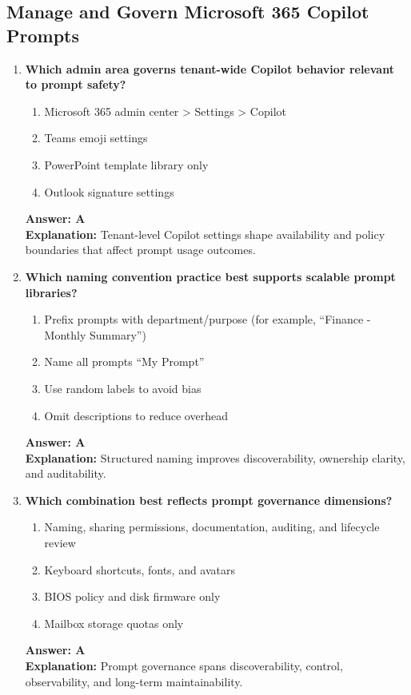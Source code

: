 \documentclass[10pt]{article}
\begin{document}
\subsection{Manage and Govern Microsoft 365 Copilot Prompts}
\begin{enumerate}[leftmargin=*]

\item \textbf{Which admin area governs tenant-wide Copilot behavior relevant to prompt safety?}
\begin{enumerate}[label=\Alph*.]
  \item Microsoft 365 admin center > Settings > Copilot
  \item Teams emoji settings
  \item PowerPoint template library only
  \item Outlook signature settings
\end{enumerate}
\textbf{Answer: A}\\
\textbf{Explanation:} Tenant-level Copilot settings shape availability and policy boundaries that affect prompt usage outcomes.

\item \textbf{Which naming convention practice best supports scalable prompt libraries?}
\begin{enumerate}[label=\Alph*.]
  \item Prefix prompts with department/purpose (for example, ``Finance - Monthly Summary'')
  \item Name all prompts ``My Prompt''
  \item Use random labels to avoid bias
  \item Omit descriptions to reduce overhead
\end{enumerate}
\textbf{Answer: A}\\
\textbf{Explanation:} Structured naming improves discoverability, ownership clarity, and auditability.

\item \textbf{Which combination best reflects prompt governance dimensions?}
\begin{enumerate}[label=\Alph*.]
  \item Naming, sharing permissions, documentation, auditing, and lifecycle review
  \item Keyboard shortcuts, fonts, and avatars
  \item BIOS policy and disk firmware only
  \item Mailbox storage quotas only
\end{enumerate}
\textbf{Answer: A}\\
\textbf{Explanation:} Prompt governance spans discoverability, control, observability, and long-term maintainability.

\end{enumerate}
\end{document}
